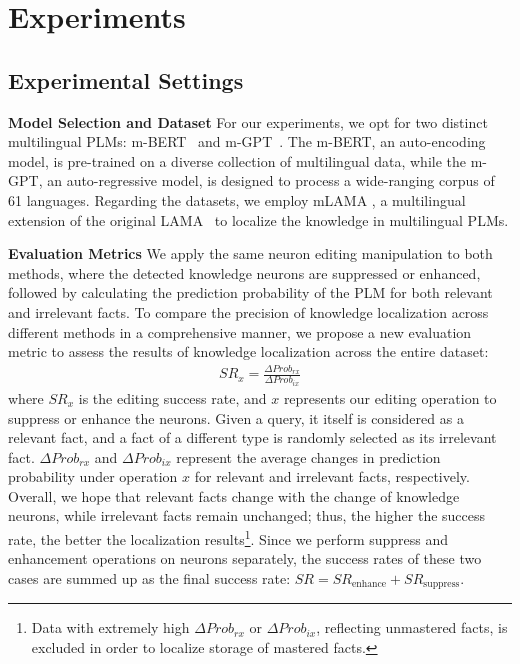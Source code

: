 \documentclass[]{article}
\newcommand{\vpara}[1]{\vspace{0.05in}\noindent\textbf{#1 }}
\begin{document}
\section{Experiments}
\subsection{Experimental Settings}
\vpara{Model Selection and Dataset}
For our experiments, we opt for two distinct multilingual PLMs: m-BERT~\cite{mbert} and m-GPT~\cite{mgpt}. The m-BERT, an auto-encoding model, is pre-trained on a diverse collection of multilingual data, while the m-GPT, an auto-regressive model, is designed to process a wide-ranging corpus of 61 languages. Regarding the datasets, we employ mLAMA \cite{mlama}, a multilingual extension of the original LAMA~\cite{fill-in-the-blank,lama2} to localize the knowledge in multilingual PLMs. 

\vpara{Evaluation Metrics}
We apply the same neuron editing manipulation to both methods, where the detected knowledge neurons are suppressed or enhanced, followed by calculating the prediction probability of the PLM for both relevant and irrelevant facts. To compare the precision of knowledge localization across different methods in a comprehensive manner, we propose a new evaluation metric to assess the results of knowledge localization across the entire dataset:
{\small\begin{align}
    SR_x = \frac{{\Delta Prob_{rx}}}{{\Delta Prob_{ix}}}
\end{align}
}where \( SR_x \) is the editing success rate, and \( x \) represents our editing operation to suppress or enhance the neurons. Given a query, it itself is considered as a relevant fact, and a fact of a different type is randomly selected as its irrelevant fact. $\Delta Prob_{rx}$ and $\Delta Prob_{ix}$ represent the average changes in prediction probability under operation $x$ for relevant and irrelevant facts, respectively. Overall, we hope that relevant facts change with the change of knowledge neurons, while irrelevant facts remain unchanged; thus, the higher the success rate, the better the localization results\footnote{Data with extremely high $\Delta Prob_{rx}$ or \( \Delta Prob_{ix} \), reflecting unmastered facts, is excluded in order to localize storage of mastered facts.}. Since we perform suppress and enhancement operations on neurons separately, the success rates of these two cases are summed up as the final success rate: $SR = {SR_{\text{enhance}}}+{SR_{\text{suppress}}}$.
\end{document}
